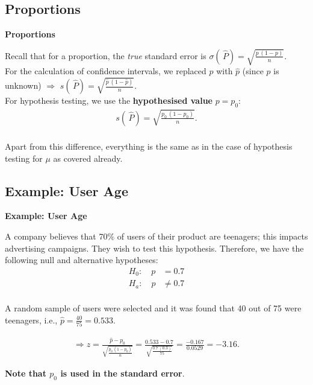 \documentclass[compress]{beamer}        %
\makeatletter
\newcommand{\tcb}{\textcolor{beamer@blendedblue}}
\makeatother
\begin{document}
\subsection{Proportions}
\begin{frame}{\bf \tcb{Proportions}}

Recall that for a proportion, the \emph{true} standard error is $\sigma(\,\widehat{\!P}) = \sqrt{\frac{p\,(1-p)}{n}}$.\\[0.8cm]

For the calculation of confidence intervals, we replaced $p$ with $\hat p$ (since $p$ is unknown) $\Rightarrow$ $s(\,\widehat{\!P}) = \sqrt{\frac{\hat p\,(1-\hat p)}{n}}$. \\[0.8cm]

For hypothesis testing, we use the {\bf hypothesised value} $p = p_0$:\\
\begin{align*}
\boxed{s(\,\widehat{\!P}) = \sqrt{\frac{p_0\,(1-p_0)}{n}}}.\\[-0.4cm]
\end{align*}

Apart from this difference, everything is the same as in the case of hypothesis testing for $\mu$ as covered already.

\end{frame}



\subsection{Example: User Age}
\begin{frame}{\bf \tcb{Example: User Age}}

A company believes that 70\% of users of their product are teenagers; this impacts advertising campaigns. They wish to test this hypothesis. Therefore, we have the following null and alternative hypotheses:\\[-0.2cm]
\begin{align*}
H_0: \quad p &= 0.7\\[0.2cm]
H_a: \quad p &\ne 0.7\\[-0.5cm]
\end{align*}

A random sample of users were selected and it was found that 40 out of 75 were teenagers, i.e., $\hat p = \frac{40}{75} = 0.533$.

\begin{align*}
\Rightarrow z = \frac{\hat p - p_0}{\sqrt{\frac{p_0\,(1-p_0)}{n}}} = \frac{0.533 - 0.7}{\sqrt{\frac{0.7\,(0.3)}{75}}} = \frac{-0.167}{0.0529} = -3.16.
\end{align*}

{\bf Note that {\boldmath$p_0$} is used in the standard error}.


\end{frame}
\end{document}
